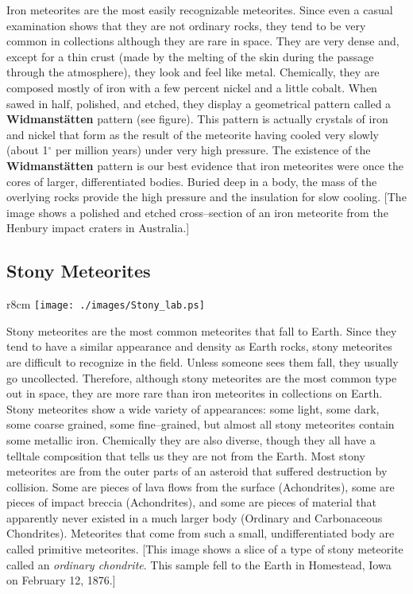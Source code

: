 Iron meteorites are the most easily recognizable meteorites.  Since even
a casual examination shows that they are not ordinary rocks, they tend
to be very common in collections although they are rare in space.
They are very dense and, except for a thin crust (made by the melting
of the skin during the passage through the atmosphere), they look and
feel like metal.  Chemically, they are composed mostly of iron with a
few percent nickel and a little cobalt.  When sawed in half, polished,
and etched, they display a geometrical pattern called a {\bf
  Widmanst\"atten} pattern (see figure).  This pattern is actually
crystals of iron and nickel that form as the result of the meteorite
having cooled very slowly (about 1$^{\circ}$ per million years) under
very high pressure.  The existence of the {\bf Widmanst\"atten}
pattern is our best evidence that iron meteorites were once the cores
of larger, differentiated bodies.  Buried deep in a body, the mass of
the overlying rocks provide the high pressure and the insulation for
slow cooling.  [The image shows a polished and etched cross--section
of an iron meteorite from the Henbury impact craters in Australia.]


\clearpage

\subsection*{Stony Meteorites}

\begin{wrapfigure}{r}{8cm}
\texttt{[image: ./images/Stony\_lab.ps]}
\end{wrapfigure}

Stony meteorites are the most common meteorites that fall to Earth.
Since they tend to have a similar appearance and density as Earth
rocks, stony meteorites are difficult to recognize in the field.
Unless someone sees them fall, they usually go uncollected.
Therefore, although stony meteorites are the most common type out in
space, they are more rare than iron meteorites in collections on
Earth.  Stony meteorites show a wide variety of appearances: some
light, some dark, some coarse grained, some fine--grained, but almost
all stony meteorites contain some metallic iron.  Chemically they are
also diverse, though they all have a telltale composition that tells
us they are not from the Earth.  Most stony meteorites are from the
outer parts of an asteroid that suffered destruction by collision.
Some are pieces of lava flows from the surface (Achondrites), some are
pieces of impact breccia (Achondrites), and some are pieces of
material that apparently never existed in a much larger body (Ordinary
and Carbonaceous Chondrites).  Meteorites that come from such a small,
undifferentiated body are called primitive meteorites.  [This image
shows a slice of a type of stony meteorite called an {\it ordinary
chondrite}.  This sample fell to the Earth in Homestead, Iowa on
February 12, 1876.]


